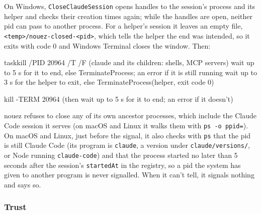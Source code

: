 \documentclass[10pt,a4paper]{article}
\newcommand{\code}[1]{\texttt{#1}}
\begin{document}
On Windows, \code{CloseClaudeSession} opens handles to the session's process and its helper and
checks their creation times again; while the handles are open, neither pid can pass to another
process. For a helper's session it leaves an empty file, \code{<temp>/nouez-closed-<pid>}, which
tells the helper the end was intended, so it exits with code 0 and Windows Terminal closes the
window. Then:

\begin{plain}
taskkill /PID 20964 /T /F    (claude and its children: shells, MCP servers)
wait up to 5 s for it to end, else TerminateProcess; an error if it is still running
wait up to 3 s for the helper to exit, else TerminateProcess(helper, exit code 0)
\end{plain}
\begin{plain}
kill -TERM 20964             (then wait up to 5 s for it to end; an error if it doesn't)
\end{plain}

nouez refuses to close any of its own ancestor processes, which include the Claude Code session
it serves (on macOS and Linux it walks them with \code{ps -o ppid=}). On macOS and Linux, just
before the signal, it also checks with \code{ps} that the pid is still Claude Code (its program is
\code{claude}, a version under \code{claude/versions/}, or Node running \code{claude-code}) and
that the process started no later than 5 seconds after the session's \code{startedAt} in the
registry, so a pid the system has given to another program is never signalled. When it can't tell,
it signals nothing and says so.

\subsubsection*{Trust}
\label{sec:trust}
\end{document}
